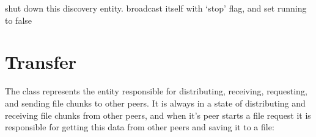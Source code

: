 \documentclass[letterpaper,10pt,english,openany,oneside]{sphinxmanual}
\begin{document}
\begin{fulllineitems}
\begin{fulllineitems}
\end{fulllineitems}


\begin{fulllineitems}
\label{\detokenize{index:discovery.PeerDiscovery.stop}}
\pysigstartsignatures
\pysiglinewithargsret
{}
{}
{}
\pysigstopsignatures
\sphinxAtStartPar
shut down this discovery entity. broadcast itself with ‘stop’ flag, and set running to false

\end{fulllineitems}


\end{fulllineitems}



\chapter{Transfer}
\label{\detokenize{index:transfer}}
\sphinxAtStartPar
The  class represents the entity responsible for distributing, receiving,
requesting, and sending file chunks to other peers. It is always in a state of distributing
and receiving file chunks from other peers, and when it’s peer starts a file request it is
responsible for getting this data from other peers and saving it to a file:
\end{document}
